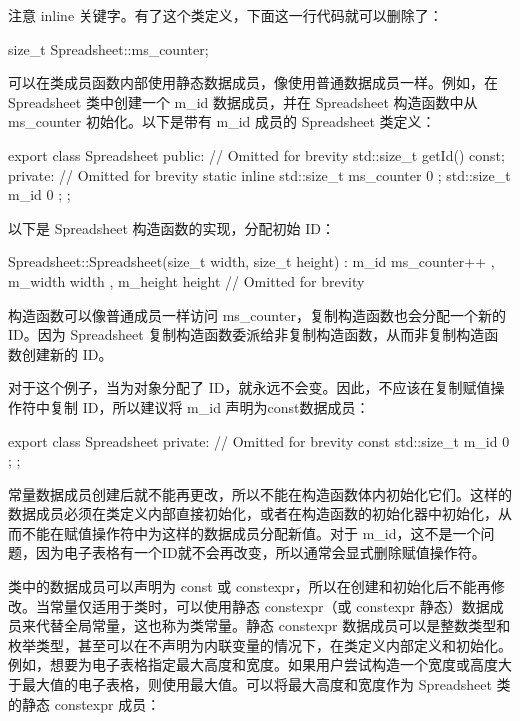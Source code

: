 注意 inline 关键字。有了这个类定义，下面这一行代码就可以删除了：

\begin{cpp}
size_t Spreadsheet::ms_counter;
\end{cpp}


可以在类成员函数内部使用静态数据成员，像使用普通数据成员一样。例如，在 Spreadsheet 类中创建一个 m\_id 数据成员，并在 Spreadsheet 构造函数中从 ms\_counter 初始化。以下是带有 m\_id 成员的 Spreadsheet 类定义：

\begin{cpp}
export class Spreadsheet
{
    public:
        // Omitted for brevity
        std::size_t getId() const;
    private:
        // Omitted for brevity
        static inline std::size_t ms_counter { 0 };
        std::size_t m_id { 0 };
};
\end{cpp}

以下是 Spreadsheet 构造函数的实现，分配初始 ID：

\begin{cpp}
Spreadsheet::Spreadsheet(size_t width, size_t height)
    : m_id { ms_counter++ }, m_width { width }, m_height { height }
{
    // Omitted for brevity
}
\end{cpp}

构造函数可以像普通成员一样访问 ms\_counter，复制构造函数也会分配一个新的 ID。因为 Spreadsheet 复制构造函数委派给非复制构造函数，从而非复制构造函数创建新的 ID。

对于这个例子，当为对象分配了 ID，就永远不会变。因此，不应该在复制赋值操作符中复制 ID，所以建议将 m\_id 声明为const数据成员：

\begin{cpp}
export class Spreadsheet
{
    private:
        // Omitted for brevity
        const std::size_t m_id { 0 };
};
\end{cpp}

常量数据成员创建后就不能再更改，所以不能在构造函数体内初始化它们。这样的数据成员必须在类定义内部直接初始化，或者在构造函数的初始化器中初始化，从而不能在赋值操作符中为这样的数据成员分配新值。对于 m\_id，这不是一个问题，因为电子表格有一个ID就不会再改变，所以通常会显式删除赋值操作符。


类中的数据成员可以声明为 const 或 constexpr，所以在创建和初始化后不能再修改。当常量仅适用于类时，可以使用静态 constexpr（或 constexpr 静态）数据成员来代替全局常量，这也称为类常量。静态 constexpr 数据成员可以是整数类型和枚举类型，甚至可以在不声明为内联变量的情况下，在类定义内部定义和初始化。例如，想要为电子表格指定最大高度和宽度。如果用户尝试构造一个宽度或高度大于最大值的电子表格，则使用最大值。可以将最大高度和宽度作为 Spreadsheet 类的静态 constexpr 成员：

